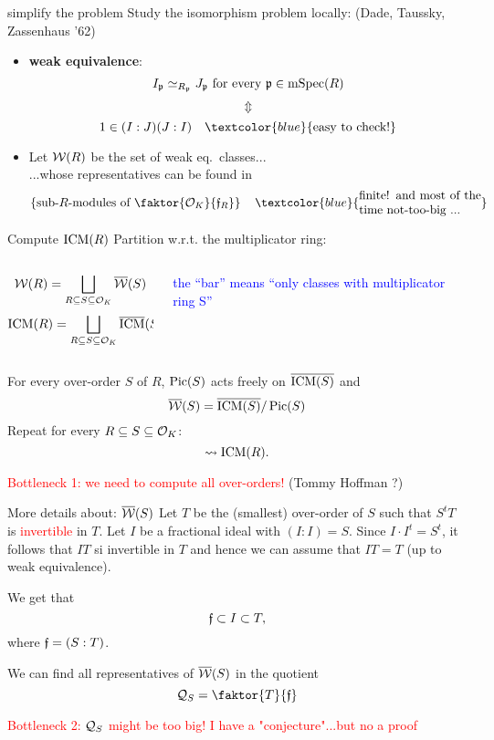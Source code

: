 \documentclass[usenames,dvipsnames]{beamer}
\newcommand{\red}[1]{\textcolor{red}{#1}}
\begin{document}
\begin{frame}{ simplify the problem  }
Study the isomorphism problem locally: (Dade, Taussky, Zassenhaus '62)
\begin{itemize}
\pause \item  \textbf{weak equivalence}:
\[I_{\mathfrak p}\simeq_{R_{\mathfrak p}} J_{\mathfrak p} \text{ for every }{\mathfrak p}\in \operatorname{mSpec}(R)\]
\pause \vspace{-6mm}\[\Updownarrow\]
\[1\in (I:J)(J:I)\quad \textcolor{blue}{\text{easy to check!}}\]
\pause \item Let ${\mathcal W}(R)$ be the set of weak eq.~classes...\\
\pause ...whose representatives can be found in
	\[\set{\text{sub-$R$-modules of $\faktor{\cO_K}{\frf_R}$}}\quad \textcolor{blue}{\parbox{10 em}{finite! and most of the time not-too-big ...}}\]
\end{itemize}
\end{frame}

\begin{frame}{ Compute $\operatorname{ICM}(R)$ }
\pause Partition w.r.t. the multiplicator ring:
    \begin{columns}
    \begin{column}{0.5\textwidth}
      \[ {\mathcal W}(R) = \bigsqcup_{R\subseteq S \subseteq {\mathcal O}_K} \overline {{\mathcal W}}(S)\]
      \[\operatorname{ICM}(R) = \bigsqcup_{R\subseteq S \subseteq {\mathcal O}_K} \overline {\operatorname{ICM}}(S)\]
    \end{column}
\pause
    \begin{column}{0.5\textwidth}  %
	\begin{center}
	\textcolor{blue}{\parbox{10em}{the ``bar'' means ``only classes with multiplicator ring S''}} 
	\end{center}
    \end{column}
    \end{columns}
\pause
   \begin{theorem}[M.]
    For every over-order $S$ of $R$, $\operatorname{Pic}(S)$ acts freely on $\overline{\operatorname{ICM}(S)}$ and
    \[ \overline{{\mathcal W}}(S) = \overline{\operatorname{ICM}(S)}/\operatorname{Pic}(S) \]
\pause Repeat for every $R\subseteq S \subseteq {\mathcal O}_K$:
    \[ \rightsquigarrow \operatorname{ICM}(R).\]
   \end{theorem}
    \red{Bottleneck 1: we need to compute all over-orders!} (Tommy Hoffman ?)
\end{frame}

\begin{frame}{ More details about: $\overline{{\mathcal W}}(S)$ }
    Let $T$ be the (smallest) over-order of $S$ such that $S^{t}T$ is \red{invertible} in $T$.
    \pause Let $I$ be a fractional ideal with $(I:I)=S$. 
    \pause Since $I\cdot I^{t}=S^{t}$, it follows that $IT$ si invertible in $T$ and hence we can assume that $IT=T$ (up to weak equivalence).
    
    \pause We get that
    \[ {\mathfrak f} \subset I \subset T, \]
    where ${\mathfrak f}=(S:T)$.
    \begin{prop}
    \pause We can find all representatives of $\overline{{\mathcal W}}(S)$ in the quotient
    \[ \cQ_{S}=\faktor{T}{\frf} \]
    \end{prop}
    \pause \red{Bottleneck 2: ${\mathcal Q}_{S}$ might be too big! I have a "conjecture"...but no a proof}
\end{frame}
\end{document}

